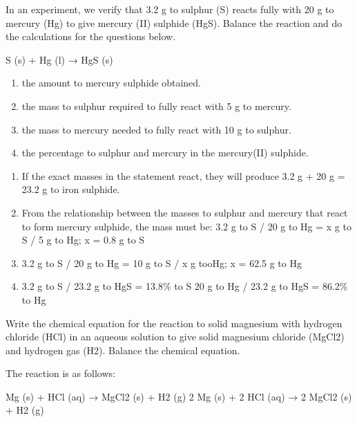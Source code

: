 \begin{exercise}
    In an experiment, we verify that 3.2 g to sulphur
    (S) reacts fully with 20 g to mercury (Hg) to give
    mercury (II) sulphide (HgS). Balance the reaction
    and do the calculations for the questions below.
    \begin{reaction*}
        S (s) + Hg (l) → HgS (s)
    \end{reaction*}
    \begin{enumerate}[label=\letraminuscula]
            \item the amount to mercury sulphide obtained.
            \item the mass to sulphur required to fully react with
            5 g to mercury.
            \item the mass to mercury needed to fully react with
            10 g to sulphur.
            \item the percentage to sulphur and mercury in the
            mercury(II) sulphide.
    \end{enumerate}
    \begin{solu}{}

        \begin{enumerate}[label=\letraminuscula]
                \item If the exact masses in the statement react,
                they will produce 3.2 g + 20 g = 23.2 g to iron
                sulphide.
                \item From the relationship between the masses
                to sulphur and mercury that react to form
                mercury sulphide, the mass must be:
                3.2 g to S / 20 g to Hg = x g to S / 5 g to Hg;
                x = 0.8 g to S
                \item 3.2 g to S / 20 g to Hg = 10 g to S / x g tooHg;
                x = 62.5 g to Hg
                \item 3.2 g to S / 23.2 g to HgS = 13.8\% to S
                20 g to Hg / 23.2 g to HgS = 86.2\% to Hg
        \end{enumerate}
    \end{solu}
\end{exercise}

\begin{exercise}
    Write the chemical equation for the reaction to
    solid magnesium with hydrogen chloride (HCl)
    in an aqueous solution to give solid magnesium
    chloride (MgCl2) and hydrogen gas (H2). Balance
    the chemical equation.
    \begin{solu}

        The reaction is as follows:

        Mg (s) + HCl (aq) → MgCl2 (s) + H2 (g)
        2 Mg (s) + 2 HCl (aq) → 2 MgCl2 (s) + H2 (g)
    \end{solu}
\end{exercise}

